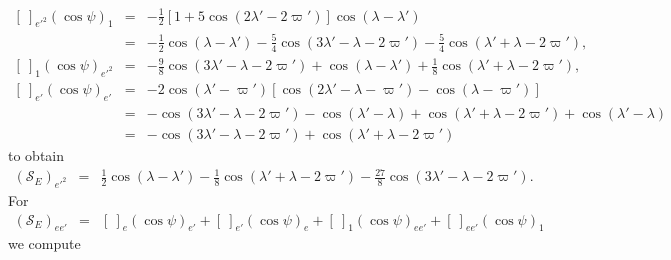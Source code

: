 \documentclass [12pt, a4paper] {article}
\begin{document}
\begin {eqnarray}
    \left[\:\right]_{e'^2}
    \left(\cos\psi\right)_1
    &=&
    - \frac{1}{2}[1 + 5\cos(2\lambda' - 2\varpi')]\cos(\lambda - \lambda')
    \\
    &=&
    -
    \frac{1}{2}\cos(\lambda - \lambda')
    -
    \frac{5}{4}\cos(3\lambda' - \lambda - 2\varpi')
    -
    \frac{5}{4}\cos(\lambda' + \lambda - 2\varpi'),
    \\
    \left[\:\right]_1
    \left(\cos\psi\right)_{e'^2}
    &=&
    -
    \frac{9}{8}\cos(3\lambda' - \lambda - 2\varpi')
    +
    \cos(\lambda - \lambda')
    +
    \frac{1}{8}\cos(\lambda' + \lambda - 2\varpi'),
    \\
    \left[\:\right]_{e'}
    \left(\cos\psi\right)_{e'}
    &=&
    -2\cos(\lambda' - \varpi')
    \left[
        \cos(2\lambda' - \lambda - \varpi') - \cos(\lambda - \varpi')
    \right]
    \\
    &=&
    -
    \cos(3\lambda' - \lambda - 2\varpi')
    -
    \cos(\lambda' - \lambda)
    +
    \cos(\lambda' + \lambda - 2\varpi')
    +
    \cos(\lambda' - \lambda)
    \\
    &=&
    -
    \cos(3\lambda' - \lambda - 2\varpi')
    +
    \cos(\lambda' + \lambda - 2\varpi')
\end {eqnarray}
to obtain 
\begin {eqnarray}
    (\mathcal{S}_E)_{e'^2}
    &=& 
    \frac{1}{2}\cos(\lambda - \lambda')
    -
    \frac{1}{8}\cos(\lambda' + \lambda - 2\varpi')
    -
    \frac{27}{8}\cos(3\lambda' - \lambda - 2\varpi').
\end {eqnarray}
For 
\begin {eqnarray}
    (\mathcal{S}_E)_{ee'}
    &=& 
    \left[\:\right]_{e}
    \left(\cos\psi\right)_{e'}
    +
    \left[\:\right]_{e'}
    \left(\cos\psi\right)_{e}
    +
    \left[\:\right]_{1}
    \left(\cos\psi\right)_{ee'}
    +
    \left[\:\right]_{ee'}
    \left(\cos\psi\right)_{1}
\end {eqnarray}
we compute 
\end{document}
